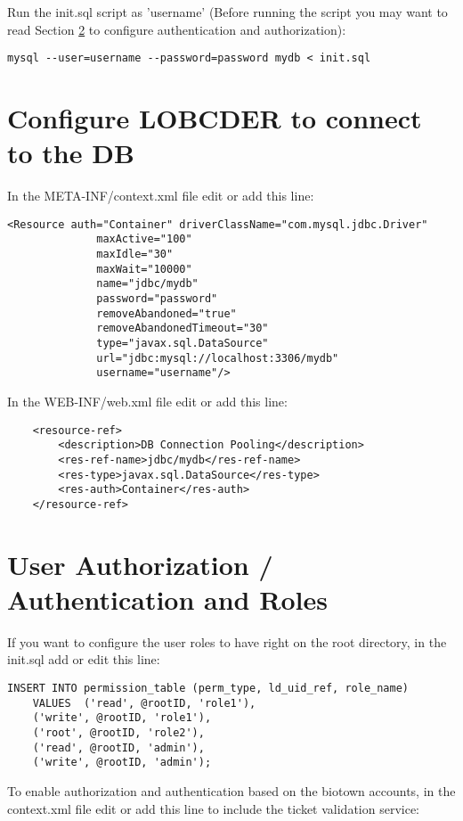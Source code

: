 \documentclass[a4paper,10pt]{article}
\begin{document}
Run the init.sql script as 'username' (Before running the script you may want to read Section \ref{sec:auth} to 
configure authentication and authorization): 

\begin{lstlisting}
mysql --user=username --password=password mydb < init.sql
\end{lstlisting}

\section{Configure LOBCDER to connect to the DB}
In the META-INF/context.xml file edit or add this line:

\begin{lstlisting}
<Resource auth="Container" driverClassName="com.mysql.jdbc.Driver" 
			  maxActive="100" 
			  maxIdle="30" 
			  maxWait="10000" 
			  name="jdbc/mydb" 
			  password="password"
			  removeAbandoned="true"
			  removeAbandonedTimeout="30" 
			  type="javax.sql.DataSource" 
			  url="jdbc:mysql://localhost:3306/mydb" 
			  username="username"/>
\end{lstlisting}

In the WEB-INF/web.xml file edit or add this line:
\begin{lstlisting}
    <resource-ref>
        <description>DB Connection Pooling</description>
        <res-ref-name>jdbc/mydb</res-ref-name>
        <res-type>javax.sql.DataSource</res-type>
        <res-auth>Container</res-auth>
    </resource-ref>
\end{lstlisting}

\section{User Authorization / Authentication and Roles}\label{sec:auth}

If you want to configure the user roles to have right on the root directory, in the init.sql add or edit this line: 

\begin{lstlisting}
INSERT INTO permission_table (perm_type, ld_uid_ref, role_name) 
	VALUES  ('read', @rootID, 'role1'),
	('write', @rootID, 'role1'),
	('root', @rootID, 'role2'),
	('read', @rootID, 'admin'),
	('write', @rootID, 'admin');
\end{lstlisting}

To enable authorization and authentication based on the biotown accounts, in the context.xml file edit or add this 
line to include the ticket validation service:
\end{document}
